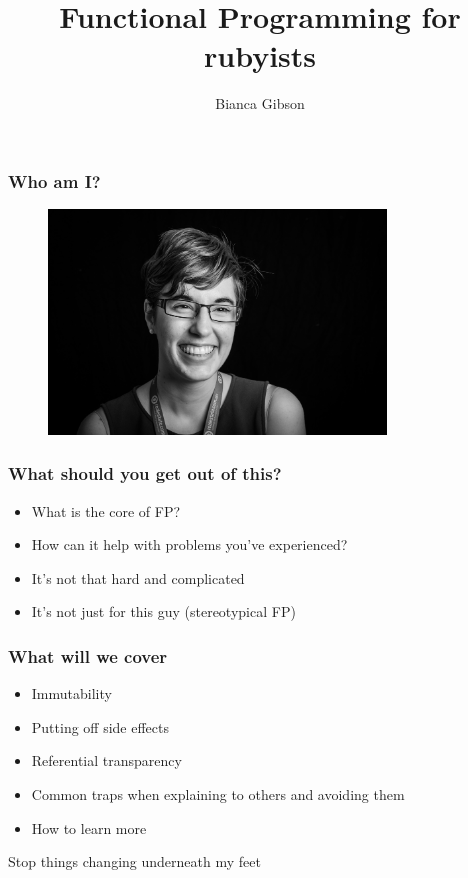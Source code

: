 \documentclass{beamer}
\title{Functional Programming for rubyists}
\author{Bianca Gibson}
\institute{Ruby Conf AU 2016}
\date{}
\begin{document}
\frame{\titlepage}

\begin{frame}
\frametitle{Who am I?}
\begin{figure}[p]
  \includegraphics[width=0.8\textwidth]{./assets/portrait.jpg}
\end{figure}
\end{frame}

\begin{frame}
\frametitle{What should you get out of this?}
\begin{itemize}
  \item What is the core of FP?
  \item How can it help with problems you've experienced?
  \item It's not that hard and complicated
  \item It's not just for this guy (stereotypical FP)
\end{itemize}
\end{frame}

\begin{frame}
\frametitle{What will we cover}
\begin{itemize}
  \item Immutability
  \item Putting off side effects
  \item Referential transparency
  \item Common traps when explaining to others and avoiding them
  \item How to learn more
\end{itemize}
\end{frame}

\begin{frame}
\begin{center}
\Huge Stop things changing underneath my feet
\end{center}
\end{frame}
\end{document}
